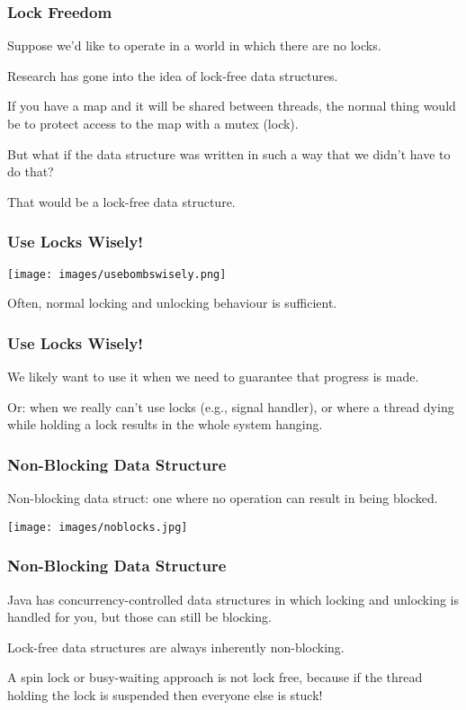 \begin{frame}
\frametitle{Lock Freedom}

Suppose we'd like to operate in a world in which there are no locks. 

Research has gone into the idea of lock-free data structures. 

If you have a map and it will be shared between threads, the normal thing would be to protect access to the map with a mutex (lock). 

But what if the data structure was written in such a way that we didn't have to do that? 

That would be a lock-free data structure.

\end{frame}

\begin{frame}
\frametitle{Use Locks Wisely!}

\begin{center}
	\texttt{[image: images/usebombswisely.png]}
\end{center}

Often, normal locking and unlocking behaviour is sufficient.

\end{frame}

\begin{frame}
\frametitle{Use Locks Wisely!}


We likely want to use it when we need to guarantee that progress is made. 

Or: when we really can't use locks (e.g., signal handler), or where a thread dying while holding a lock results in the whole system hanging.

\end{frame}

\begin{frame}
\frametitle{Non-Blocking Data Structure}

Non-blocking data struct: one where no operation can result in being blocked. 


\begin{center}
	\texttt{[image: images/noblocks.jpg]}
\end{center}


\end{frame}

\begin{frame}
\frametitle{Non-Blocking Data Structure}

Java has concurrency-controlled data structures in which locking and unlocking is handled for you, but those can still be blocking. 

Lock-free data structures are always inherently non-blocking. 

A spin lock or busy-waiting approach is not lock free, because if the thread holding the lock is suspended then everyone else is stuck!

\end{frame}

